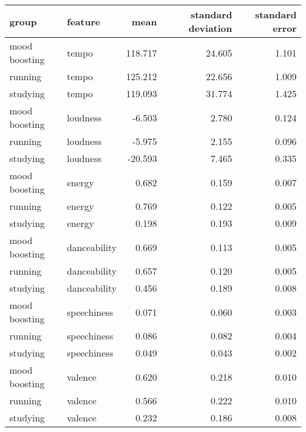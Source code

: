 \begin{tabular}{llrrr}
\toprule
         group &       feature &    mean &  standard deviation &  standard error \\
\midrule
 mood boosting &         tempo & 118.717 &              24.605 &           1.101 \\
       running &         tempo & 125.212 &              22.656 &           1.009 \\
      studying &         tempo & 119.093 &              31.774 &           1.425 \\
 mood boosting &      loudness &  -6.503 &               2.780 &           0.124 \\
       running &      loudness &  -5.975 &               2.155 &           0.096 \\
      studying &      loudness & -20.593 &               7.465 &           0.335 \\
 mood boosting &        energy &   0.682 &               0.159 &           0.007 \\
       running &        energy &   0.769 &               0.122 &           0.005 \\
      studying &        energy &   0.198 &               0.193 &           0.009 \\
 mood boosting &  danceability &   0.669 &               0.113 &           0.005 \\
       running &  danceability &   0.657 &               0.120 &           0.005 \\
      studying &  danceability &   0.456 &               0.189 &           0.008 \\
 mood boosting &   speechiness &   0.071 &               0.060 &           0.003 \\
       running &   speechiness &   0.086 &               0.082 &           0.004 \\
      studying &   speechiness &   0.049 &               0.043 &           0.002 \\
 mood boosting &       valence &   0.620 &               0.218 &           0.010 \\
       running &       valence &   0.566 &               0.222 &           0.010 \\
      studying &       valence &   0.232 &               0.186 &           0.008 \\
\bottomrule
\end{tabular}
